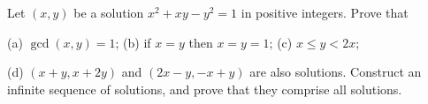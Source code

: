Let $(x, y)$ be a solution $x^2 + xy - y^2 = 1$ in positive integers. Prove that

(a) $\gcd(x, y) = 1$; (b) if $x = y$ then $x = y = 1$; (c) $x \leq y < 2x$;

(d) $(x + y, x + 2y)$ and $(2x - y, -x + y)$ are also solutions. Construct an infinite sequence of solutions, and prove that they comprise all solutions.
